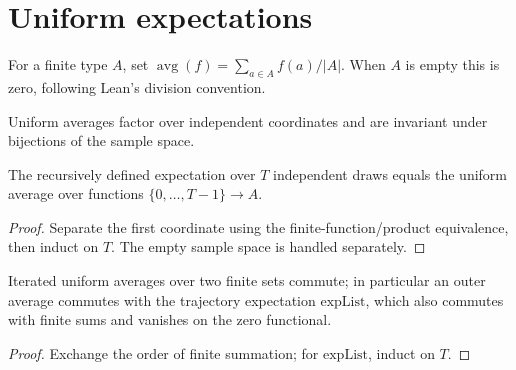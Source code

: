 \section{Uniform expectations}
\begin{definition}\label{def:avg}
\leanok
For a finite type $A$, set $\operatorname{avg}(f)=\sum_{a\in A}f(a)/|A|$.
When $A$ is empty this is zero, following Lean's division convention.
\end{definition}
\begin{lemma}\label{lem:uniform-product}
\leanok{}
Uniform averages factor over independent coordinates and are invariant under
bijections of the sample space.
\end{lemma}
\begin{lemma}\label{lem:uniform-trajectory}
\leanok{}
The recursively defined expectation over $T$ independent draws equals the
uniform average over functions $\{0,\ldots,T-1\}\to A$.
\end{lemma}
\begin{proof}\leanok
Separate the first coordinate using the finite-function/product equivalence,
then induct on $T$. The empty sample space is handled separately.
\end{proof}
\begin{lemma}\label{lem:avg-commute}
\leanok{}
Iterated uniform averages over two finite sets commute; in particular an outer
average commutes with the trajectory expectation $\mathrm{expList}$, which also
commutes with finite sums and vanishes on the zero functional.
\end{lemma}
\begin{proof}\leanok
Exchange the order of finite summation; for $\mathrm{expList}$, induct on $T$.
\end{proof}

